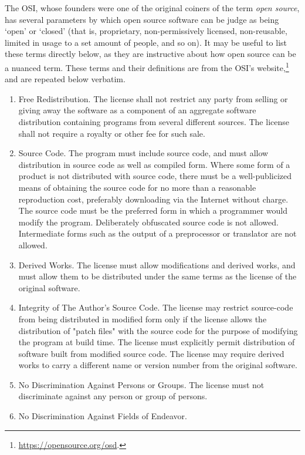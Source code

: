 The OSI, whose founders were one of the original coiners of the term {\it open source}, has several parameters by which open source software can be judge as being `open' or `closed' (that is, proprietary, non-permissively licensed, non-reusable, limited in usage to a set amount of people, and so on). It may be useful to list these terms directly below, as they are instructive about how open source can be a nuanced term. These terms and their definitions are from the OSI's website,\footnote{\href{https://opensource.org/osd}{https://opensource.org/osd}. } and are repeated below verbatim.

\begin{enumerate}
\item{Free Redistribution}. The license shall not restrict any party from selling or giving away the software as a component of an aggregate software distribution containing programs from several different sources. The license shall not require a royalty or other fee for such sale.
\item{Source Code}. The program must include source code, and must allow distribution in source code as well as compiled form. Where some form of a product is not distributed with source code, there must be a well-publicized means of obtaining the source code for no more than a reasonable reproduction cost, preferably downloading via the Internet without charge. The source code must be the preferred form in which a programmer would modify the program. Deliberately obfuscated source code is not allowed. Intermediate forms such as the output of a preprocessor or translator are not allowed.
\item{Derived Works}. The license must allow modifications and derived works, and must allow them to be distributed under the same terms as the license of the original software.
\item{Integrity of The Author's Source Code}.
  The license may restrict source-code from being distributed in modified form only if the license allows the distribution of "patch files" with the source code for the purpose of modifying the program at build time. The license must explicitly permit distribution of software built from modified source code. The license may require derived works to carry a different name or version number from the original software.
\item{No Discrimination Against Persons or Groups}.
  The license must not discriminate against any person or group of persons.
\item{No Discrimination Against Fields of Endeavor}.

\end{enumerate}
